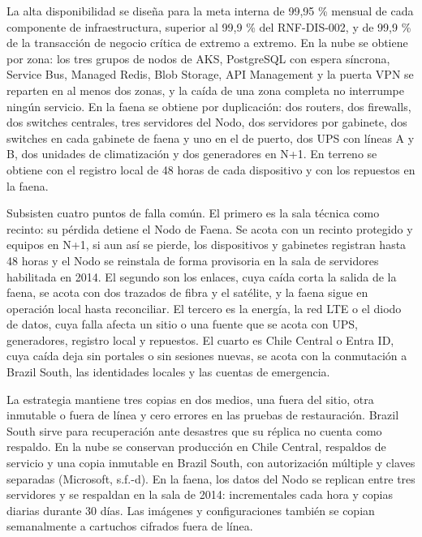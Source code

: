 \documentclass[subdoc]{../../comun/overfore}
\begin{document}
La alta disponibilidad se diseña para la meta interna de 99,95 \% mensual de cada componente de infraestructura, superior al 99,9 \% del RNF-DIS-002, y de 99,9 \% de la transacción de negocio crítica de extremo a extremo. En la nube se obtiene por zona: los tres grupos de nodos de AKS, PostgreSQL con espera síncrona, Service Bus, Managed Redis, Blob Storage, API Management y la puerta VPN se reparten en al menos dos zonas, y la caída de una zona completa no interrumpe ningún servicio. En la faena se obtiene por duplicación: dos routers, dos firewalls, dos switches centrales, tres servidores del Nodo, dos servidores por gabinete, dos switches en cada gabinete de faena y uno en el de puerto, dos UPS con líneas A y B, dos unidades de climatización y dos generadores en N+1. En terreno se obtiene con el registro local de 48 horas de cada dispositivo y con los repuestos en la faena.

Subsisten cuatro puntos de falla común. El primero es la sala técnica como recinto: su pérdida detiene el Nodo de Faena. Se acota con un recinto protegido y equipos en N+1, si aun así se pierde, los dispositivos y gabinetes registran hasta 48 horas y el Nodo se reinstala de forma provisoria en la sala de servidores habilitada en 2014. El segundo son los enlaces, cuya caída corta la salida de la faena, se acota con dos trazados de fibra y el satélite, y la faena sigue en operación local hasta reconciliar. El tercero es la energía, la red LTE o el diodo de datos, cuya falla afecta un sitio o una fuente que se acota con UPS, generadores, registro local y repuestos. El cuarto es Chile Central o Entra ID, cuya caída deja sin portales o sin sesiones nuevas, se acota con la conmutación a Brazil South, las identidades locales y las cuentas de emergencia.

La estrategia mantiene tres copias en dos medios, una fuera del sitio, otra inmutable o fuera de línea y cero errores en las pruebas de restauración. Brazil South sirve para recuperación ante desastres que su réplica no cuenta como respaldo. En la nube se conservan producción en Chile Central, respaldos de servicio y una copia inmutable en Brazil South, con autorización múltiple y claves separadas (Microsoft, s.f.-d). En la faena, los datos del Nodo se replican entre tres servidores y se respaldan en la sala de 2014: incrementales cada hora y copias diarias durante 30 días. Las imágenes y configuraciones también se copian semanalmente a cartuchos cifrados fuera de línea.
\end{document}
